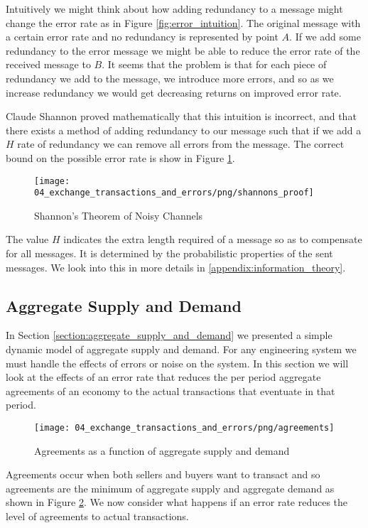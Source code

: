 Intuitively we might think about how adding redundancy to a message might change the error rate as
in Figure \ref{fig:error_intuition}. The original message with a certain error rate and no
redundancy is represented by point $A$. If we add some redundancy to the error message we might be
able to reduce the error rate of the received message to $B$. It seems that the problem is that for
each piece of redundancy we add to the message, we introduce more errors, and so as we increase
redundancy we would get decreasing returns on improved error rate.

Claude Shannon proved mathematically that this intuition is incorrect, and that there exists a
method of adding redundancy to our message such that if we add a $H$ rate of redundancy we can
remove all errors from the message. The correct bound on the possible error rate is show in Figure
\ref{fig:shannons_proof}.

\begin{figure}[H]
\centering
\texttt{[image: 04\_exchange\_transactions\_and\_errors/png/shannons\_proof]}
\caption{Shannon's Theorem of Noisy Channels}
\label{fig:shannons_proof}
\end{figure}

The value $H$ indicates the extra length required of a message so as to compensate for all messages.
It is determined by the probabilistic properties of the sent messages. We look into this in more
details in \ref{appendix:information_theory}.

\subsection{Aggregate Supply and Demand}

In Section \ref{section:aggregate_supply_and_demand} we presented a simple dynamic model of aggregate supply and
demand. For any engineering system we must handle the effects of errors or noise on the system. In
this section we will look at the effects of an error rate that reduces the per period aggregate
agreements of an economy to the actual transactions that eventuate in that period.

\begin{figure}[H]
\centering
\texttt{[image: 04\_exchange\_transactions\_and\_errors/png/agreements]}
\caption{Agreements as a function of aggregate supply and demand}
\label{fig:agreements}
\end{figure}

Agreements occur when both sellers and buyers want to transact and so agreements are the minimum of
aggregate supply and aggregate demand as shown in Figure \ref{fig:agreements}. We now consider what
happens if an error rate reduces the level of agreements to actual transactions.

